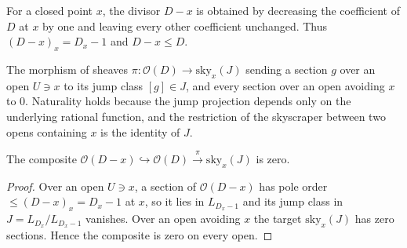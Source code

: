 \begin{definition}
  \label{pa-def:devissageDivisor}
  \leanok

  For a closed point \(x\), the divisor \(D - x\) is obtained by decreasing the coefficient of \(D\)
  at \(x\) by one and leaving every other coefficient unchanged. Thus \((D-x)_x = D_x - 1\) and
  \(D - x \le D\).
\end{definition}

\begin{definition}
  \label{pa-def:devissagePi}
  \leanok

  The morphism of sheaves \(\pi : \mathcal O(D) \to \mathrm{sky}_x(J)\) sending a section \(g\) over
  an open \(U \ni x\) to its jump class \([g] \in J\), and every section over an open avoiding \(x\)
  to \(0\). Naturality holds because the jump projection depends only on the underlying rational
  function, and the restriction of the skyscraper between two opens containing \(x\) is the identity
  of \(J\).
\end{definition}

\begin{lemma}
  \label{pa-lem:devissage_comp_eq_zero}
  \leanok

  The composite \(\mathcal O(D-x) \hookrightarrow \mathcal O(D) \xrightarrow{\ \pi\ }
  \mathrm{sky}_x(J)\) is zero.
\end{lemma}
\begin{proof}
  \leanok
  Over an open \(U \ni x\), a section of \(\mathcal O(D-x)\) has pole order \(\le (D-x)_x = D_x - 1\)
  at \(x\), so it lies in \(L_{D_x - 1}\) and its jump class in \(J = L_{D_x}/L_{D_x - 1}\) vanishes.
  Over an open avoiding \(x\) the target \(\mathrm{sky}_x(J)\) has zero sections. Hence the composite
  is zero on every open.
\end{proof}

